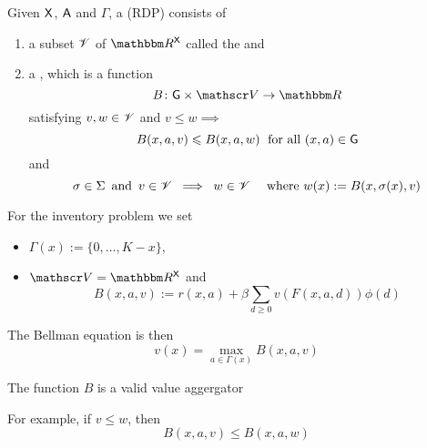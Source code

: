 \begin{frame}
    
    Given $\mathsf X$, $\mathsf A$ and $\Gamma$, a  (RDP) consists of
    
        \vspace{0.5em}
    \begin{enumerate}
        \item a subset $\mathscr V$ of $\RR^\Xsf$ called the 
             and
        \vspace{0.5em}
        \vspace{0.5em}
        \item a , which is a function
                \begin{equation*}
                    B \colon \Gsf \times \vV \to \RR
                \end{equation*}
              satisfying $v, w \in \mathscr V$ and $v \leq w \implies$
              \vspace{0.5em}
              \begin{equation*}
                B(x, a, v) \leqslant B(x, a, w) \; \text{ for all $(x, a) \in \mathsf G$}
              \end{equation*}
              and 
                \begin{equation*}
                    \sigma \in \Sigma 
                    \, \text{ and } \,
                    v \in \mathscr V
                    \; \implies \;
                    w \in \mathscr V
                    \quad \text{ where }
                    w(x) := B(x, \sigma(x), v)
                \end{equation*}
    \end{enumerate}

\end{frame}


\begin{frame}
    

    \Eg For the inventory problem we set 
    \begin{itemize}
        \item $\Gamma(x) := \{0, \ldots, K - x\}$,
        \item $\vV = \RR^\Xsf$ and
        \begin{equation*}
            B(x, a, v) :=
                r(x, a)
                + \beta
                \sum_{d \geq 0} v(F(x,a,d)) \phi(d)
        \end{equation*}
    \end{itemize}

    The Bellman equation is then 
    $$v(x) = \max_{a \in \Gamma(x)} B(x, a, v)$$

    The function $B$ is a valid value aggergator

    For example, if $v \leq w$, then
    \begin{equation*}
        B(x, a, v) \leq B(x, a, w)
    \end{equation*}

\end{frame}


